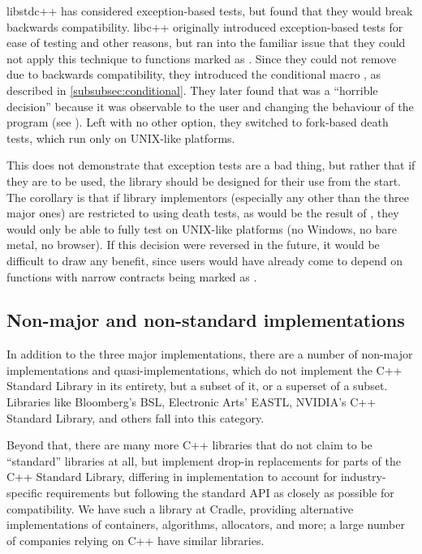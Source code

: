 libstdc++ has considered exception-based tests, but found that they would break backwards compatibility. libc++ originally introduced exception-based tests for ease of testing and other reasons, but ran into the familiar issue that they could not apply this technique to functions marked as . Since they could not remove  due to backwards compatibility, they introduced the conditional  macro  , as described in \ref{subsubsec:conditional}. They later found that  was a ``horrible decision'' because  it was observable to the user and changing the behaviour of the program (see \cite{LLVMReviewD59166}). Left with no other option, they switched to fork-based death tests, which run only on UNIX-like platforms.

This does not demonstrate that exception tests are a bad thing, but rather that if they are to be used, the library should be designed for their use from the start. The corollary is that if library implementors (especially any other than the three major ones) are restricted to using death tests, as would be the result of \cite{P1656R2}, they would only be able to fully test on UNIX-like platforms (no Windows, no bare metal, no browser). If this decision were reversed in the future, it would be difficult to draw any benefit, since users would have already come to depend on functions with narrow contracts being marked as .

\subsection{Non-major and non-standard implementations}

In addition to the three major implementations, there are a number of non-major implementations and quasi-implementations, which do not implement the C++ Standard Library in its entirety, but a subset of it, or a superset of a subset. Libraries like Bloomberg's BSL, Electronic Arts' EASTL, NVIDIA's C++ Standard Library, and others fall into this category.

Beyond that, there are many more C++ libraries that do not claim to be ``standard'' libraries at all, but implement drop-in replacements for parts of the C++ Standard Library, differing in implementation to account for industry-specific requirements but following the standard API as closely as possible for compatibility. We have such a library at Cradle, providing alternative implementations of containers, algorithms, allocators, and more; a large number of companies relying on C++ have similar libraries.

